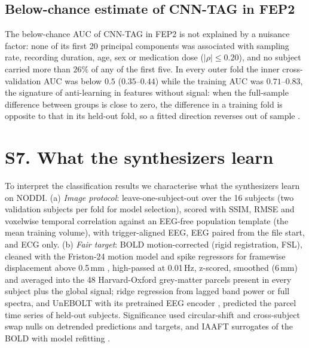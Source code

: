 \documentclass[10pt]{article}
\begin{document}
\subsection*{Below-chance estimate of CNN-TAG in FEP2}

The below-chance AUC of CNN-TAG in FEP2 is not explained by a nuisance factor: none of its first 20 principal components was associated with sampling rate, recording duration, age, sex or medication dose ($|\rho|\leq0.20$), and no subject carried more than $26\%$ of any of the first five. In every outer fold the inner cross-validation AUC was below $0.5$ ($0.35$--$0.44$) while the training AUC was $0.71$--$0.83$, the signature of anti-learning in features without signal: when the full-sample difference between groups is close to zero, the difference in a training fold is opposite to that in its held-out fold, so a fitted direction reverses out of sample \cite{varoquaux2018}.

\section*{S7. What the synthesizers learn}

To interpret the classification results we characterise what the synthesizers learn on NODDI. (a) \emph{Image protocol}: leave-one-subject-out over the 16 subjects (two validation subjects per fold for model selection), scored with SSIM, RMSE and voxelwise temporal correlation against an EEG-free population template (the mean training volume), with trigger-aligned EEG, EEG paired from the file start, and ECG only. (b) \emph{Fair target}: BOLD motion-corrected (rigid registration, FSL), cleaned with the Friston-24 motion model and spike regressors for framewise displacement above 0.5\,mm \cite{friston1996,power2014}, high-passed at 0.01\,Hz, z-scored, smoothed (6\,mm) and averaged into the 48 Harvard-Oxford grey-matter parcels present in every subject plus the global signal; ridge regression from lagged band power or full spectra, and UnEBOLT \cite{li2026unebolt} with its pretrained EEG encoder \cite{jiang2024labram}, predicted the parcel time series of held-out subjects. Significance used circular-shift and cross-subject swap nulls on detrended predictions and targets, and IAAFT surrogates of the BOLD with model refitting \cite{schreiber1996,mehta2025time}.



\end{document}
